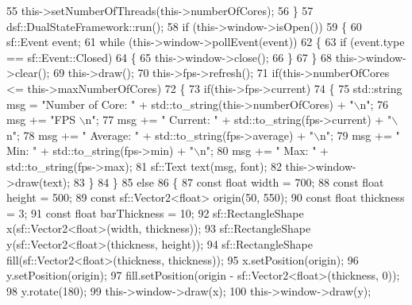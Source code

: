 \begin{DoxyCodeInclude}
55         this->setNumberOfThreads(this->numberOfCores);
56     \}
57     dsf::DualStateFramework::run();
58     \textcolor{keywordflow}{if} (this->window->isOpen())
59     \{
60         sf::Event event;
61         \textcolor{keywordflow}{while} (this->window->pollEvent(event))
62         \{
63             \textcolor{keywordflow}{if} (event.type == sf::Event::Closed)
64             \{
65                 this->window->close();
66             \}
67         \}
68         this->window->clear();
69         this->draw();
70         this->fps->refresh();
71         \textcolor{keywordflow}{if}(this->numberOfCores <= this->maxNumberOfCores)
72         \{
73             \textcolor{keywordflow}{if}(this->fps->current)
74             \{
75                 std::string msg = \textcolor{stringliteral}{"Number of Core: "} + std::to\_string(this->numberOfCores) + \textcolor{stringliteral}{"\(\backslash\)n"};
76                 msg += \textcolor{stringliteral}{"FPS \(\backslash\)n"};
77                 msg += \textcolor{stringliteral}{" Current: "} + std::to\_string(fps->current) + \textcolor{stringliteral}{"\(\backslash\)n"};
78                 msg += \textcolor{stringliteral}{" Average: "} + std::to\_string(fps->average) + \textcolor{stringliteral}{"\(\backslash\)n"};
79                 msg += \textcolor{stringliteral}{" Min: "} + std::to\_string(fps->min) + \textcolor{stringliteral}{"\(\backslash\)n"};
80                 msg += \textcolor{stringliteral}{" Max: "} + std::to\_string(fps->max);
81                 sf::Text text(msg, font);
82                 this->window->draw(text);
83             \}
84         \}
85         \textcolor{keywordflow}{else}
86         \{
87             \textcolor{keyword}{const} \textcolor{keywordtype}{float} width = 700;
88             \textcolor{keyword}{const} \textcolor{keywordtype}{float} height = 500;
89             \textcolor{keyword}{const} sf::Vector2<float> origin(50, 550);
90             \textcolor{keyword}{const} \textcolor{keywordtype}{float} thickness = 3;
91             \textcolor{keyword}{const} \textcolor{keywordtype}{float} barThickness = 10;
92             sf::RectangleShape x(sf::Vector2<float>(width, thickness));
93             sf::RectangleShape y(sf::Vector2<float>(thickness, height));
94             sf::RectangleShape fill(sf::Vector2<float>(thickness, thickness));
95             x.setPosition(origin);
96             y.setPosition(origin);
97             fill.setPosition(origin - sf::Vector2<float>(thickness, 0));
98             y.rotate(180);
99             this->window->draw(x);
100             this->window->draw(y);

\end{DoxyCodeInclude}
